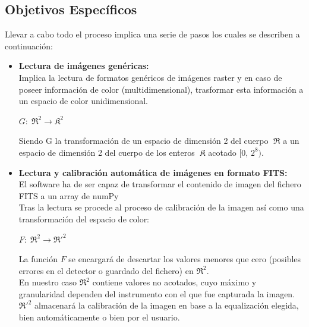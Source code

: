 	\subsection{Objetivos Específicos}
	Llevar a cabo todo el proceso implica una serie de pasos los cuales se describen a continuación:
	\begin{itemize}
		\item \textbf{Lectura de imágenes genéricas:}\\
		Implica la lectura de formatos genéricos de imágenes raster y en caso de poseer información de color (multidimensional), trasformar esta información a un espacio de color unidimensional.
		\begin{center}
		{\large $G:\mathfrak{\;R^{2}\rightarrow\mathfrak{K^{2}}}$}
		\end{center}
		Siendo G la transformación de un espacio de dimensión 2 del cuerpo $\mathfrak{\;R}$ a un espacio de dimensión 2 del cuerpo de los enteros $\mathfrak{\;K}$ acotado {[}0, $2^{8})$.
		
		\item \textbf{Lectura y calibración automática de imágenes en formato FITS:}\\
		El software ha de ser capaz de transformar el contenido de imagen del fichero FITS a un array de numPy \\
		Tras la lectura se procede al proceso de calibración de la imagen así como una transformación del espacio de color:
		\begin{center}
		{\large 	$F:\mathfrak{\;\mathfrak{R^{2}}\rightarrow\mathfrak{\mathfrak{R'}^{2}}}$}
		\end{center}
		La función $F$ se encargará de descartar los valores menores que cero (posibles errores en el detector o guardado del fichero) en $\mathfrak{R^{2}}$.\\
		En nuestro caso $\mathfrak{R^{2}}$ contiene valores no acotados, cuyo máximo y granularidad dependen del instrumento con el que fue capturada la imagen.\\
		$\mathfrak{R'}^{2}$ almacenará la calibración de la imagen en base a la equalización elegida, bien automáticamente o bien por el usuario.


\end{itemize}
